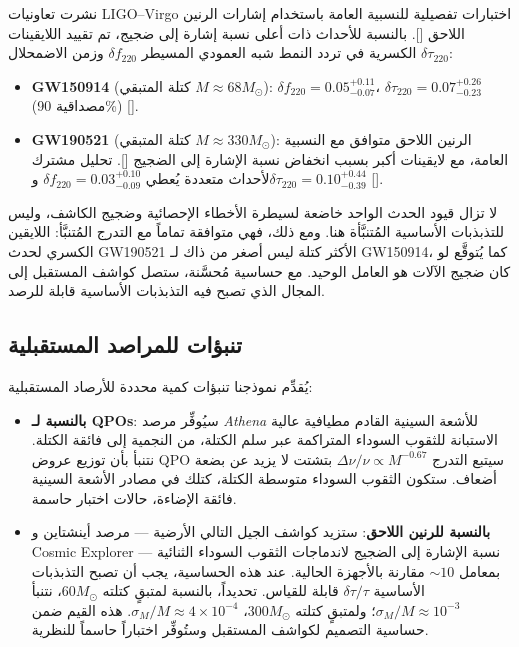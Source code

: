 \documentclass[11pt,a4paper]{article}
\begin{document}
	نشرت تعاونيات LIGO–Virgo اختبارات تفصيلية للنسبية العامة باستخدام إشارات الرنين اللاحق [\cite{LIGO2021, Ghosh2021}]. بالنسبة للأحداث ذات أعلى نسبة إشارة إلى ضجيج، تم تقييد اللايقينات الكسرية في تردد النمط شبه العمودي المسيطر \(\delta f_{220}\) وزمن الاضمحلال \(\delta \tau_{220}\):
	
	\begin{itemize}
		\item \textbf{GW150914} (كتلة المتبقي \(M \approx 68 M_\odot\)): \(\delta f_{220} = 0.05^{+0.11}_{-0.07}\)، \(\delta \tau_{220} = 0.07^{+0.26}_{-0.23}\) (مصداقية 90\%) [\cite{Ghosh2021}].
		\item \textbf{GW190521} (كتلة المتبقي \(M \approx 330 M_\odot\)): الرنين اللاحق متوافق مع النسبية العامة، مع لايقينات أكبر بسبب انخفاض نسبة الإشارة إلى الضجيج [\cite{Abbott2020b}]. تحليل مشترك لأحداث متعددة يُعطي \(\delta f_{220} = 0.03^{+0.10}_{-0.09}\) و\(\delta \tau_{220} = 0.10^{+0.44}_{-0.39}\) [\cite{Ghosh2021}].
	\end{itemize}
	
	لا تزال قيود الحدث الواحد خاضعة لسيطرة الأخطاء الإحصائية وضجيج الكاشف، وليس للتذبذبات الأساسية المُتنبَّأة هنا. ومع ذلك، فهي متوافقة تماماً مع التدرج المُتنبَّأ: اللايقين الكسري لحدث GW190521 الأكثر كتلة ليس أصغر من ذاك لـ GW150914، كما يُتوقَّع لو كان ضجيج الآلات هو العامل الوحيد. مع حساسية مُحسَّنة، ستصل كواشف المستقبل إلى المجال الذي تصبح فيه التذبذبات الأساسية قابلة للرصد.
	
	\subsection{تنبؤات للمراصد المستقبلية}
	
	يُقدِّم نموذجنا تنبؤات كمية محددة للأرصاد المستقبلية:
	
	\begin{itemize}
		\item \textbf{بالنسبة لـ QPOs}: سيُوفِّر مرصد \textit{Athena} للأشعة السينية القادم مطيافية عالية الاستبانة للثقوب السوداء المتراكمة عبر سلم الكتلة، من النجمية إلى فائقة الكتلة. نتنبأ بأن توزيع عروض QPO سيتبع التدرج \(\Delta\nu/\nu \propto M^{-0.67}\) بتشتت لا يزيد عن بضعة أضعاف. ستكون الثقوب السوداء متوسطة الكتلة، كتلك في مصادر الأشعة السينية فائقة الإضاءة، حالات اختبار حاسمة.
		
		\item \textbf{بالنسبة للرنين اللاحق}: ستزيد كواشف الجيل التالي الأرضية — مرصد أينشتاين و Cosmic Explorer — نسبة الإشارة إلى الضجيج لاندماجات الثقوب السوداء الثنائية بمعامل \(\sim 10\) مقارنة بالأجهزة الحالية. عند هذه الحساسية، يجب أن تصبح التذبذبات الأساسية \(\delta\tau/\tau\) قابلة للقياس. تحديداً، بالنسبة لمتبقٍ كتلته \(60 M_\odot\)، نتنبأ \(\sigma_M/M \approx 10^{-3}\)؛ ولمتبقٍ كتلته \(300 M_\odot\)، \(\sigma_M/M \approx 4 \times 10^{-4}\). هذه القيم ضمن حساسية التصميم لكواشف المستقبل وستُوفِّر اختباراً حاسماً للنظرية.
	\end{itemize}
	
\end{document}
